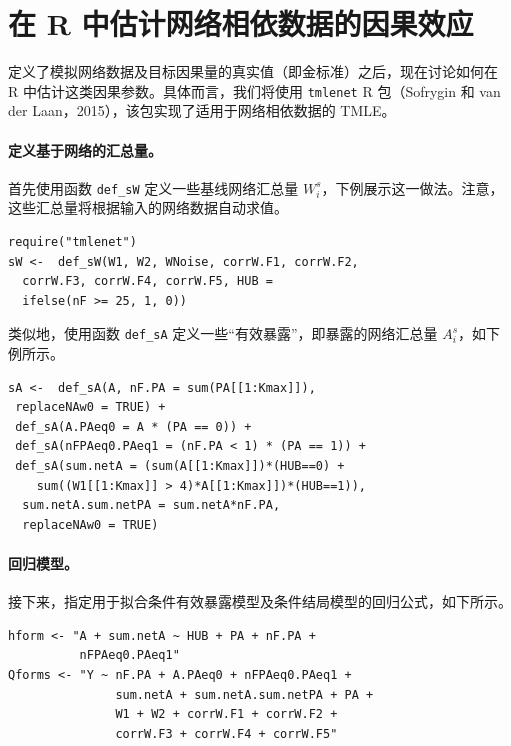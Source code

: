 \section{在 R 中估计网络相依数据的因果效应}

定义了模拟网络数据及目标因果量的真实值（即金标准）之后，现在讨论如何在 R 中估计这类因果参数。具体而言，我们将使用 \texttt{tmlenet} R 包（Sofrygin 和 van der Laan，2015），该包实现了适用于网络相依数据的 TMLE。

\paragraph{定义基于网络的汇总量。}
首先使用函数 \texttt{def\_sW} 定义一些基线网络汇总量 $W_i^s$，下例展示这一做法。注意，这些汇总量将根据输入的网络数据自动求值。
\par\noindent\begin{minipage}{\linewidth}
\begin{lstlisting}[numbers=none,frame=none]
require("tmlenet")
sW <-  def_sW(W1, W2, WNoise, corrW.F1, corrW.F2,
  corrW.F3, corrW.F4, corrW.F5, HUB =
  ifelse(nF >= 25, 1, 0))
\end{lstlisting}
\end{minipage}\par
类似地，使用函数 \texttt{def\_sA} 定义一些“有效暴露”，即暴露的网络汇总量 $A_i^s$，如下例所示。
\par\noindent\begin{minipage}{\linewidth}
\begin{lstlisting}[numbers=none,frame=none]
sA <-  def_sA(A, nF.PA = sum(PA[[1:Kmax]]),
 replaceNAw0 = TRUE) +
 def_sA(A.PAeq0 = A * (PA == 0)) +
 def_sA(nFPAeq0.PAeq1 = (nF.PA < 1) * (PA == 1)) +
 def_sA(sum.netA = (sum(A[[1:Kmax]])*(HUB==0) +
    sum((W1[[1:Kmax]] > 4)*A[[1:Kmax]])*(HUB==1)),
  sum.netA.sum.netPA = sum.netA*nF.PA,
  replaceNAw0 = TRUE)
\end{lstlisting}
\end{minipage}\par

\paragraph{回归模型。}
接下来，指定用于拟合条件有效暴露模型及条件结局模型的回归公式，如下所示。
\par\noindent\begin{minipage}{\linewidth}
\begin{lstlisting}[numbers=none,frame=none]
hform <- "A + sum.netA ~ HUB + PA + nF.PA +
          nFPAeq0.PAeq1"
Qforms <- "Y ~ nF.PA + A.PAeq0 + nFPAeq0.PAeq1 +
               sum.netA + sum.netA.sum.netPA + PA +
               W1 + W2 + corrW.F1 + corrW.F2 +
               corrW.F3 + corrW.F4 + corrW.F5"
\end{lstlisting}
\end{minipage}\par

